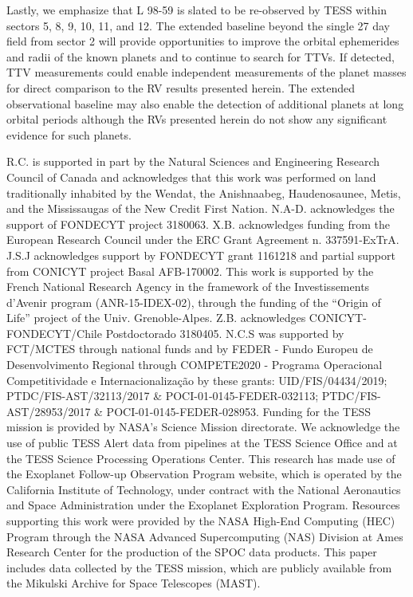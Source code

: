 \documentclass[longauth]{aa}
\begin{document}
Lastly, we emphasize that L 98-59 is slated to be re-observed by TESS within sectors 5, 8, 9, 10, 11, and 12. The extended baseline beyond the single 27 day field from sector 2 will provide opportunities to improve the orbital ephemerides and radii of the known planets and to continue to search for TTVs. If detected, TTV measurements could enable independent measurements of the planet masses for direct comparison to the RV results presented herein. The extended observational baseline may also enable the detection of additional planets at long orbital periods although the RVs presented herein do not show any significant evidence for such planets.


\begin{acknowledgements}
  R.C. is supported in part by the Natural Sciences and Engineering Research Council of Canada and 
  acknowledges that this work was performed on land traditionally inhabited by the Wendat, the Anishnaabeg, Haudenosaunee, Metis, and the
  Mississaugas of the New Credit First Nation.
  N.A-D. acknowledges the support of FONDECYT project 3180063. 
  X.B. acknowledges funding from the European Research Council under the ERC Grant Agreement n. 337591-ExTrA.
  J.S.J acknowledges support by FONDECYT grant 1161218 and partial support from CONICYT project Basal AFB-170002.
  This work is supported by the French National Research Agency in the  framework of the Investissements d’Avenir program (ANR-15-IDEX-02), through the funding of the ``Origin of Life'' project of the Univ. Grenoble-Alpes. 
  Z.B. acknowledges CONICYT-FONDECYT/Chile Postdoctorado 3180405.
  N.C.S was supported by FCT/MCTES through national funds and by FEDER - Fundo Europeu de Desenvolvimento Regional through COMPETE2020 - Programa Operacional Competitividade e Internacionalização by these grants: UID/FIS/04434/2019; PTDC/FIS-AST/32113/2017 \& POCI-01-0145-FEDER-032113; PTDC/FIS-AST/28953/2017 \& POCI-01-0145-FEDER-028953.
  Funding for the TESS mission is provided by NASA's Science Mission directorate.
  We acknowledge the use of public TESS Alert data from pipelines at the TESS Science Office and at the TESS Science Processing Operations Center.
  This research has made use of the Exoplanet Follow-up Observation Program website, which is operated by the California Institute of Technology, under contract with the National Aeronautics and Space Administration under the Exoplanet Exploration Program.
  Resources supporting this work were provided by the NASA High-End Computing (HEC) Program through the NASA Advanced Supercomputing (NAS) Division at Ames Research Center for the production of the SPOC data products.
  This paper includes data collected by the TESS mission, which are publicly available from the Mikulski Archive for Space Telescopes (MAST).
\end{acknowledgements}
\end{document}
